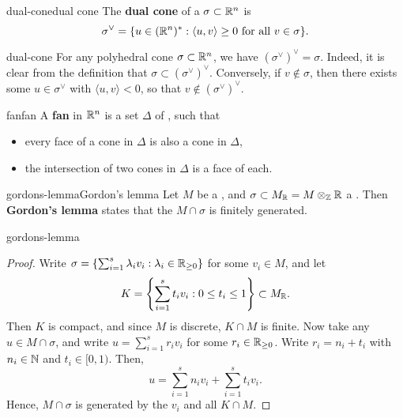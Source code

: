 \begin{topic}{dual-cone}{dual cone}
    The \textbf{dual cone} of a  $\sigma \subset \mathbb{R}^n$ is
    \[ \sigma^\vee = \{ u \in (\mathbb{R}^n)^* : \langle u, v \rangle \ge 0 \text{ for all } v \in \sigma \} . \]
\end{topic}

\begin{example}{dual-cone}
    For any polyhedral cone $\sigma \subset \mathbb{R}^n$, we have $(\sigma^\vee)^\vee = \sigma$. Indeed, it is clear from the definition that $\sigma \subset (\sigma^\vee)^\vee$. Conversely, if $v \not\in \sigma$, then there exists some $u \in \sigma^\vee$ with $\langle u, v \rangle < 0$, so that $v \not\in (\sigma^\vee)^\vee$.
\end{example}

\begin{topic}{fan}{fan}
    A \textbf{fan} in $\mathbb{R}^n$ is a set $\Delta$ of , such that
    \begin{itemize}
        \item every face of a cone in $\Delta$ is also a cone in $\Delta$,
        \item the intersection of two cones in $\Delta$ is a face of each.
    \end{itemize}
\end{topic}

\begin{topic}{gordons-lemma}{Gordon's lemma}
    Let $M$ be a  , and $\sigma \subset M_{\mathbb{R}} = M \otimes_{\mathbb{Z}} \mathbb{R}$ a . Then \textbf{Gordon's lemma} states that the  $M \cap \sigma$ is finitely generated.
\end{topic}

\begin{example}{gordons-lemma}
    \begin{proof}
        Write $\sigma = \left\{ \sum_{i = 1}^{s} \lambda_i v_i : \lambda_i \in \mathbb{R}_{\ge 0} \right\}$ for some $v_i \in M$, and let
        \[ K = \left\{ \sum_{i = 1}^{s} t_i v_i : 0 \le t_i \le 1 \right\} \subset M_{\mathbb{R}} . \]
        Then $K$ is compact, and since $M$ is discrete, $K \cap M$ is finite. Now take any $u \in M \cap \sigma$, and write $u = \sum_{i = 1}^{s} r_i v_i$ for some $r_i \in \mathbb{R}_{\ge 0}$. Write $r_i = n_i + t_i$ with $n_i \in \mathbb{N}$ and $t_i \in [0, 1)$. Then,
        \[ u = \sum_{i = 1}^{s} n_i v_i + \sum_{i = 1}^{s} t_i v_i . \]
        Hence, $M \cap \sigma$ is generated by the $v_i$ and all $K \cap M$.
    \end{proof}
\end{example}

